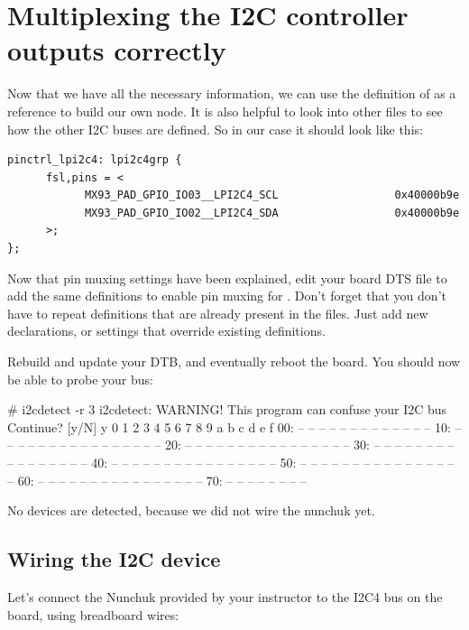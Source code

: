 \section{Multiplexing the I2C controller outputs correctly}

Now that we have all the necessary information, we can use the definition of  as a reference to build our own  node.
It is also helpful to look into other  files to see how the other I2C buses are defined. So in our case it should look like this:

{\small
\begin{verbatim}
pinctrl_lpi2c4: lpi2c4grp {
      fsl,pins = <
            MX93_PAD_GPIO_IO03__LPI2C4_SCL                  0x40000b9e
            MX93_PAD_GPIO_IO02__LPI2C4_SDA                  0x40000b9e
      >;
};
\end{verbatim}
}

Now that pin muxing settings have been explained, edit your board
DTS file to add the same definitions to enable pin muxing for .
Don't forget that you don't have to repeat definitions that are
already present in the  files. Just add new declarations, or
settings that override existing definitions.

Rebuild and update your DTB, and eventually reboot the board. You should
now be able to probe your bus:

\begin{bashinput}
# i2cdetect -r 3
i2cdetect: WARNING! This program can confuse your I2C bus
Continue? [y/N] y
     0  1  2  3  4  5  6  7  8  9  a  b  c  d  e  f
00:          -- -- -- -- -- -- -- -- -- -- -- -- --
10: -- -- -- -- -- -- -- -- -- -- -- -- -- -- -- --
20: -- -- -- -- -- -- -- -- -- -- -- -- -- -- -- --
30: -- -- -- -- -- -- -- -- -- -- -- -- -- -- -- --
40: -- -- -- -- -- -- -- -- -- -- -- -- -- -- -- --
50: -- -- -- -- -- -- -- -- -- -- -- -- -- -- -- --
60: -- -- -- -- -- -- -- -- -- -- -- -- -- -- -- --
70: -- -- -- -- -- -- -- --
\end{bashinput}

No devices are detected, because we did not wire the nunchuk yet.

\subsection{Wiring the I2C device}

Let's connect the Nunchuk provided by your instructor
to the I2C4 bus on the board, using breadboard wires:

